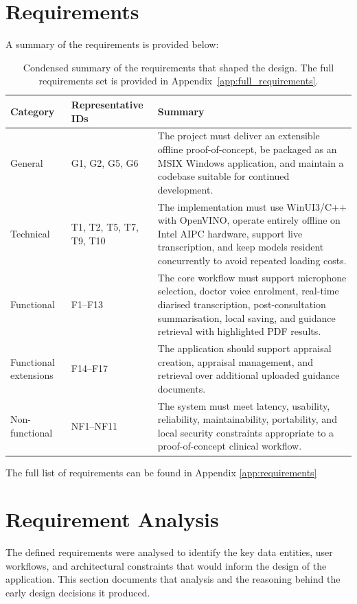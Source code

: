 \section{Requirements}
A summary of the requirements is provided below:
\begin{table}[H]
\centering
\begin{tabularx}{\textwidth}{l l X}
\toprule
\textbf{Category} & \textbf{Representative IDs} & \textbf{Summary} \\
\midrule
General & G1, G2, G5, G6 & The project must deliver an extensible offline proof-of-concept, be packaged as an MSIX Windows application, and maintain a codebase suitable for continued development. \\
Technical & T1, T2, T5, T7, T9, T10 & The implementation must use WinUI3/C++ with OpenVINO, operate entirely offline on Intel AIPC hardware, support live transcription, and keep models resident concurrently to avoid repeated loading costs. \\
Functional & F1--F13 & The core workflow must support microphone selection, doctor voice enrolment, real-time diarised transcription, post-consultation summarisation, local saving, and guidance retrieval with highlighted PDF results. \\
Functional extensions & F14--F17 & The application should support appraisal creation, appraisal management, and retrieval over additional uploaded guidance documents. \\
Non-functional & NF1--NF11 & The system must meet latency, usability, reliability, maintainability, portability, and local security constraints appropriate to a proof-of-concept clinical workflow. \\
\bottomrule
\end{tabularx}
\caption{Condensed summary of the requirements that shaped the design. The full requirements set is provided in Appendix~\ref{app:full_requirements}.}
\label{tab:requirements-summary}
\end{table}

The full list of requirements can be found in Appendix \ref{app:requirements} 

\section{Requirement Analysis}
The defined requirements were analysed to identify the key data entities, user workflows, and architectural constraints that would inform the design of the application. This section documents that analysis and the reasoning behind the early design decisions it produced.

